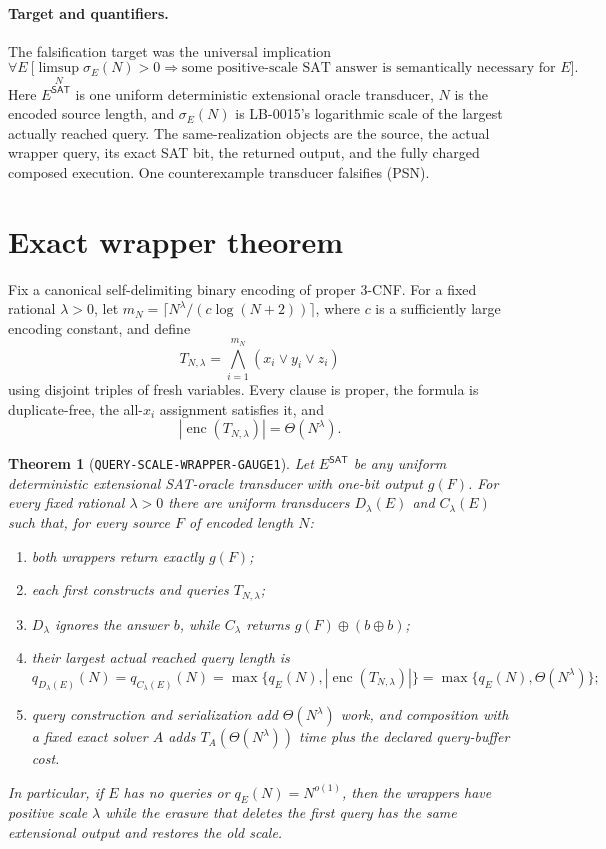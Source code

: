 \documentclass[11pt]{article}
\newtheorem{theorem}{Theorem}
\newcommand{\SAT}{\mathsf{SAT}}
\begin{document}
\paragraph{Target and quantifiers.}
The falsification target was the universal implication
\[
 \forall E\ \bigl[\limsup_N\sigma_E(N)>0
 \Longrightarrow
 \text{some positive-scale SAT answer is semantically necessary for }E\bigr].
 \tag{PSN}
\]
Here $E^{\SAT}$ is one uniform deterministic extensional oracle transducer,
$N$ is the encoded source length, and $\sigma_E(N)$ is LB-0015's logarithmic
scale of the largest actually reached query.  The same-realization objects
are the source, the actual wrapper query, its exact SAT bit, the returned
output, and the fully charged composed execution.  One counterexample
transducer falsifies (PSN).

\section{Exact wrapper theorem}

Fix a canonical self-delimiting binary encoding of proper 3-CNF.  For a fixed
rational $\lambda>0$, let $m_N=\lceil
N^\lambda/(c\log(N+2))\rceil$, where $c$ is a sufficiently large encoding
constant, and define
\[
 T_{N,\lambda}=\bigwedge_{i=1}^{m_N}(x_i\vee y_i\vee z_i)
\]
using disjoint triples of fresh variables.  Every clause is proper, the
formula is duplicate-free, the all-$x_i$ assignment satisfies it, and
\[
|\operatorname{enc}(T_{N,\lambda})|=\Theta(N^\lambda).
 \tag{1}
\]

\begin{theorem}[\texttt{QUERY-SCALE-WRAPPER-GAUGE1}]
Let $E^{\SAT}$ be any uniform deterministic extensional SAT-oracle transducer
with one-bit output $g(F)$.  For every fixed rational $\lambda>0$ there are uniform
transducers $D_\lambda(E)$ and $C_\lambda(E)$ such that, for every source
$F$ of encoded length $N$:
\begin{enumerate}[nosep]
\item both wrappers return exactly $g(F)$;
\item each first constructs and queries $T_{N,\lambda}$;
\item $D_\lambda$ ignores the answer $b$, while $C_\lambda$ returns
      $g(F)\oplus(b\oplus b)$;
\item their largest actual reached query length is
\[
 q_{D_\lambda(E)}(N)=q_{C_\lambda(E)}(N)
 =\max\{q_E(N),|\operatorname{enc}(T_{N,\lambda})|\}
 =\max\{q_E(N),\Theta(N^\lambda)\};
 \tag{2}
\]
\item query construction and serialization add $\Theta(N^\lambda)$ work,
      and composition with a fixed exact solver $A$ adds
      $T_A(\Theta(N^\lambda))$ time plus the declared query-buffer cost.
\end{enumerate}
In particular, if $E$ has no queries or $q_E(N)=N^{o(1)}$, then the wrappers
have positive scale $\lambda$ while the erasure that deletes the first query
has the same extensional output and restores the old scale.
\end{theorem}
\end{document}
